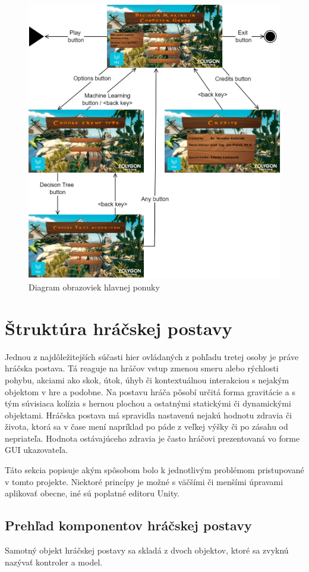 \documentclass[slovak, master]{diploma}
\begin{document}
\begin{figure}[!htbp]
	\centering
	\includegraphics[width=.85\textwidth]{Figures/mainMenuScheme.png}
	\caption{Diagram obrazoviek hlavnej ponuky}
	\label{pic:MainMenuScheme}
\end{figure}

\section{Štruktúra hráčskej postavy}
\label{sec:Player}
Jednou z najdôležitejších súčasti hier ovládaných z pohľadu tretej osoby je práve hráčska postava. Tá reaguje na hráčov vstup zmenou smeru alebo rýchlosti pohybu, akciami ako skok, útok, úhyb či kontextuálnou interakciou s nejakým objektom v hre a podobne. Na postavu hráča pôsobí určitá forma gravitácie a s tým súvisiaca kolízia s hernou plochou a ostatnými statickými či dynamickými objektami. Hráčska postava má spravidla nastavenú nejakú hodnotu zdravia či života, ktorá sa v čase mení napríklad po páde z veľkej výšky či po zásahu od nepriateľa. Hodnota ostávajúceho zdravia je často hráčovi prezentovaná vo forme GUI ukazovateľa. 

Táto sekcia popisuje akým spôsobom bolo k jednotlivým problémom pristupované v tomto projekte. Niektoré princípy je možné s väčšími či menšími úpravami aplikovať obecne, iné sú poplatné editoru Unity. 

\subsection{Prehľad komponentov hráčskej postavy}
\label{sec:PlayerComponentOverview} 
Samotný objekt hráčskej postavy sa skladá z dvoch objektov, ktoré sa zvyknú nazývať kontroler a model. 
\end{document}

